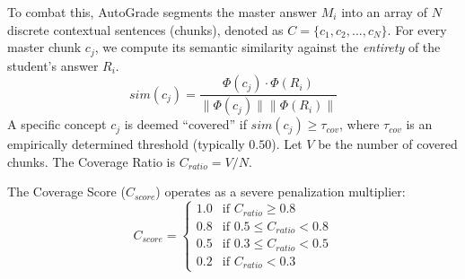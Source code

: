 \documentclass[conference]{IEEEtran}
\begin{document}
To combat this, AutoGrade segments the master answer $M_i$ into an array of $N$ discrete contextual sentences (chunks), denoted as $C = \{c_1, c_2, \dots, c_N\}$. 
For every master chunk $c_j$, we compute its semantic similarity against the \textit{entirety} of the student's answer $R_i$.
\begin{equation}
sim(c_j) = \frac{\Phi(c_j) \cdot \Phi(R_i)}{\|\Phi(c_j)\| \|\Phi(R_i)\|}
\end{equation}
A specific concept $c_j$ is deemed ``covered'' if $sim(c_j) \geq \tau_{cov}$, where $\tau_{cov}$ is an empirically determined threshold (typically $0.50$). Let $V$ be the number of covered chunks. The Coverage Ratio is $C_{ratio} = V / N$.

The Coverage Score ($C_{score}$) operates as a severe penalization multiplier:
\begin{equation}
C_{score} = 
\begin{cases} 
1.0 & \text{if } C_{ratio} \geq 0.8 \\
0.8 & \text{if } 0.5 \leq C_{ratio} < 0.8 \\
0.5 & \text{if } 0.3 \leq C_{ratio} < 0.5 \\
0.2 & \text{if } C_{ratio} < 0.3
\end{cases}
\end{equation}
\end{document}
